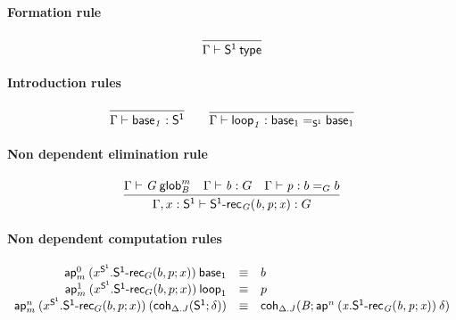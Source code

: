 \paragraph{Formation rule}

\begin{small}
  \[
  \infer{\wftype\Gamma{\dsd{S^1}}}{}
  \]
\end{small}

\paragraph{Introduction rules}

\begin{small}
  \[
  \infer{\ofglob{\Gamma}{\base{1}}{\dsd{S^1}}}{} \qquad
  \infer{\ofglob{\Gamma}{\lp{1}}{\homj{\dsd{S^1}}{\base{1}}{\base{1}}}}{}
  \]
\end{small}

\paragraph{Non dependent elimination rule}

\begin{small}
  \[
  \infer{\ofglob{\Gamma,x:\dsd{S^1}}{\dsd{S^1\text{-}rec}_G(b, p; x)}{G}}
  {\wfglob{\Gamma}{G}{m}{B} & \ofglob{\Gamma}{b}{G} &
    \ofglob{\Gamma}{p}{\homj{G}{b}{b}}}
  \]
\end{small}


\paragraph{Non dependent computation rules}

\begin{small}
  \[
  \begin{array}{rcl}
    \mathsf{ap}^{0}_{m} \: {(x^{\mathsf{S^1}}.\mathsf{S^1\text{-}rec}_G(b, p; x))} \: {\mathsf{base}_{1}} &
    \equiv & b \\
    \mathsf{ap}^{1}_{m} \: {(x^{\mathsf{S^1}}.\mathsf{S^1\text{-}rec}_G(b, p; x))} \: {\mathsf{loop}_{1}} & \equiv & p\\
    \mathsf{ap}^{n}_{m} \: {(x^{\mathsf{S^1}}.\mathsf{S^1\text{-}rec}_G(b, p; x))} \: {(\mathsf{coh}_{\Delta.J} \mathit{(\mathsf{S^1};\delta)})} & \equiv &
    \mathsf{coh}_{\Delta.J} \mathit{(B;\mathsf{ap}^{n} \: {(x.\mathsf{S^1\text{-}rec}_G(b, p; x))} \: {\delta})}
    \\
  \end{array}
  \]
\end{small}

